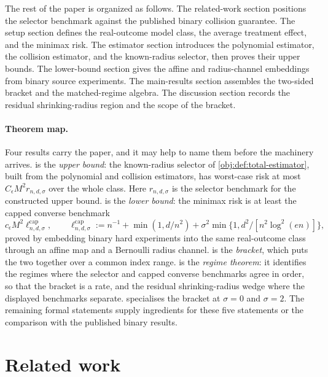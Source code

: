 \documentclass[11pt]{article}
\begin{document}
The rest of the paper is organized as follows. The related-work section positions the selector benchmark against the published binary collision guarantee. The setup section defines the real-outcome model class, the average treatment effect, and the minimax risk. The estimator section introduces the polynomial estimator, the collision estimator, and the known-radius selector, then proves their upper bounds. The lower-bound section gives the affine and radius-channel embeddings from binary source experiments. The main-results section assembles the two-sided bracket and the matched-regime algebra. The discussion section records the residual shrinking-radius region and the scope of the bracket.

\paragraph{Theorem map.} Four results carry the paper, and it may help to name them before the machinery arrives.  is the \emph{upper bound}: the known-radius selector of \cref{obj:def:total-estimator}, built from the polynomial and collision estimators, has worst-case risk at most \(C_\epsilon M^2r_{n,d,\sigma}\) over the whole class. Here \(r_{n,d,\sigma}\) is the selector benchmark for the constructed upper bound.  is the \emph{lower bound}: the minimax risk is at least the capped converse benchmark
\[
c_\epsilon M^2\ell^{\mathrm{cap}}_{n,d,\sigma},
\qquad
\ell^{\mathrm{cap}}_{n,d,\sigma}
:=
n^{-1}+\min(1,d/n^2)+\sigma^2\min\{1,d^2/[n^2\log^2(en)]\},
\]
proved by embedding binary hard experiments into the same real-outcome class through an affine map and a Bernoulli radius channel.  is the \emph{bracket}, which puts the two together over a common index range.  is the \emph{regime theorem}: it identifies the regimes where the selector and capped converse benchmarks agree in order, so that the bracket is a rate, and the residual shrinking-radius wedge where the displayed benchmarks separate.  specialises the bracket at \(\sigma=0\) and \(\sigma=2\). The remaining formal statements supply ingredients for these five statements or the comparison with the published binary results.


\section{Related work}
\end{document}
